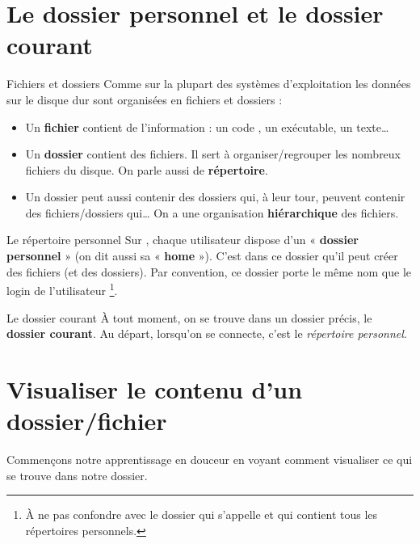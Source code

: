 \documentclass[a4paper,11pt]{style-esi/td}
\begin{document}
	\section{Le dossier personnel et le dossier courant}

		\begin{theorie}{Fichiers et dossiers}
			Comme sur la plupart des systèmes d'exploitation 
			les données sur le disque dur 
			sont organisées en fichiers et dossiers :
			\begin{itemize}
			\item 
				Un \textbf{fichier} contient de l'information : 
				un code , un exécutable, un texte\dots{}
			\item 
				Un \textbf{dossier} contient des fichiers. 
				Il sert à organiser/regrouper les nombreux fichiers du disque. 
				On parle aussi de \textbf{répertoire}.
			\item 
				Un dossier peut aussi contenir des dossiers qui, à leur tour, 
				peuvent contenir des fichiers/dossiers qui\dots{}
				On a une organisation \textbf{hiérarchique} des fichiers.
			\end{itemize}
		\end{theorie}

		\begin{theorie}{Le répertoire personnel}
			Sur , chaque utilisateur dispose d'un « \textbf{dossier personnel} » 
			(on dit aussi sa « \textbf{home} »). 
			C'est dans ce dossier qu'il peut créer des fichiers (et des dossiers). 
			Par convention, ce dossier porte le même nom que le login de l'utilisateur%
			\footnote{%
				À ne pas confondre avec le dossier qui s'appelle 
				et qui contient tous les répertoires personnels.
			}.
		\end{theorie}

		\begin{theorie}{Le dossier courant}
			À tout moment,
			on se trouve dans un dossier précis, le \og{}\textbf{dossier courant}\fg{}. 
			Au départ, lorsqu'on se connecte, c’est le \emph{répertoire personnel}.
		\end{theorie}

	\section{Visualiser le contenu d'un dossier/fichier}

		Commençons notre apprentissage en douceur
		en voyant comment visualiser ce qui se trouve dans notre dossier.
\end{document}
